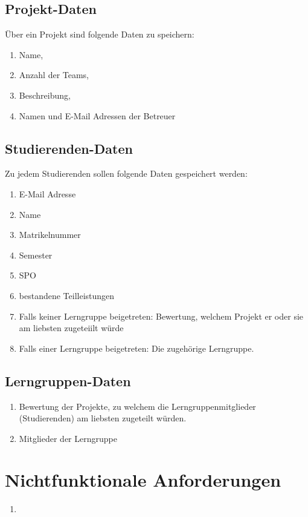 \documentclass[parskip=full]{scrartcl}
\newcommand{\swtLabel}[1]{\textbf{\textbackslash #1\arabic*0\textbackslash}}
\begin{document}
\subsection{Projekt-Daten} 
Über ein Projekt sind folgende Daten zu speichern:
\begin{enumerate}[label=\swtLabel{D}] 
  \item Name,
  \item Anzahl der Teams,
  \item Beschreibung,
  \item Namen und E-Mail Adressen der Betreuer
\end{enumerate}
\subsection{Studierenden-Daten} 
Zu jedem Studierenden sollen folgende Daten gespeichert werden:
\begin{enumerate}[label=\swtLabel{D}, resume] 
  \item E-Mail Adresse
  \item Name
  \item Matrikelnummer
  \item Semester
  \item SPO
  \item bestandene Teilleistungen
  \item Falls keiner Lerngruppe beigetreten: Bewertung, welchem Projekt er oder
  sie am liebsten zugeteiilt würde
  \item Falls einer Lerngruppe beigetreten: Die zugehörige Lerngruppe.
\end{enumerate}
\subsection{Lerngruppen-Daten} 
\begin{enumerate}[label=\swtLabel{D}, resume] 
  \item Bewertung der Projekte, zu welchem die Lerngruppenmitglieder
  (Studierenden) am liebsten zugeteilt würden.
  \item Mitglieder der Lerngruppe
\end{enumerate}

\section{Nichtfunktionale Anforderungen}
\begin{enumerate}
  \item 
\end{enumerate}
\end{document}

